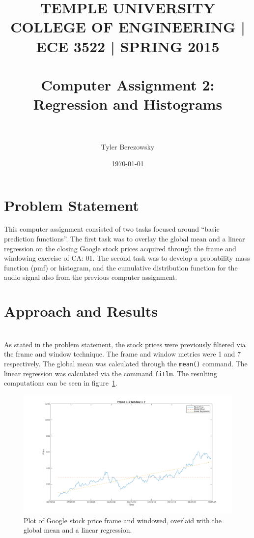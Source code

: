\documentclass[paper=a4, fontsize=11pt]{scrartcl} %
\title{	
\normalfont \normalsize 
\textsc{TEMPLE UNIVERSITY COLLEGE OF ENGINEERING | ECE 3522 | SPRING 2015} \\ [25pt] %
\horrule{0.5pt} \\[0.4cm] %
\huge Computer Assignment 2: Regression and Histograms \\ %
\horrule{2pt} \\[0.5cm] %
}
\author{Tyler Berezowsky} %
\date{\normalsize\today} %
\numberwithin{equation}{section} %
\numberwithin{figure}{section} %
\numberwithin{table}{section} %
\begin{document}
\maketitle %

\section{Problem Statement} 
This computer assignment consisted of two tasks focused around ``basic prediction functions''. The first task was to overlay the global mean and a linear regression on the closing Google stock prices acquired through the frame and windowing exercise of CA: 01. The second task was to develop a probability mass function (pmf) or histogram, and the cumulative  distribution function for the audio signal also from the previous computer assignment. 


\section{Approach and Results} 

 \\
As stated in the problem statement, the stock prices were previously filtered via the frame and window technique. The frame and window metrics were 1 and 7 respectively. The global mean was calculated through the \verb|mean()| command. The linear regression was calculated  via the command \verb|fitlm|. The resulting computations can be seen in figure~\ref{fig: liner_regression}. 

\begin{figure}[h] %
	\centering 
	\includegraphics[width=\linewidth]{lg_01}
	\caption{Plot of Google stock price frame and windowed, overlaid with the global mean and a linear regression.}
	\label{fig: liner_regression} 
\end{figure}
\end{document}
